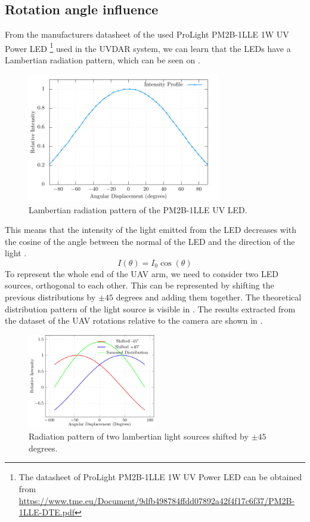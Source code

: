 \subsection{Rotation angle influence}
From the manufacturers datasheet of the used ProLight PM2B-1LLE 1W \ac{UV} Power \ac{LED} \footnote{The datasheet of ProLight PM2B-1LLE 1W UV Power LED can be obtained from \url{https://www.tme.eu/Document/9dfb498784ffdd07892a42f4f17c6f37/PM2B-1LLE-DTE.pdf}}
used in the UVDAR system, we can learn that the \ac{LED}s have a Lambertian radiation pattern,
which can be seen on .
\begin {figure}[H]
	\centering
	\includegraphics[width=0.75\textwidth]{./fig/semestral/lambertian/_new_lambertian.pdf}
	\caption{Lambertian radiation pattern of the PM2B-1LLE UV LED.}
	\label{fig:lambertian}
\end{figure}
This means that the intensity of the light emitted from the LED decreases with the cosine
of the angle between the normal of the LED and the direction of the light .
\begin{equation}
	I(\theta) = I_0\cos(\theta)
	\label{eq:lambertian}
\end{equation}
To represent the whole end of the \ac{UAV} arm, we need to consider two \ac{LED} sources, orthogonal to each other.
This can be represented by shifting the previous distributions by $\pm 45$ degrees and adding them together. The 
theoretical distribution pattern of the light source is visible in . 
The results extracted from the dataset of the \ac{UAV} rotations relative to the camera are shown in .
\begin {figure}[H]
	\centering
	\includegraphics[width=0.50\textwidth]{./fig/semestral/lambertian/3lambertian.pdf}
	\caption{Radiation pattern of two lambertian light sources shifted by $\pm 45$ degrees.}
	\label{fig:lambert_combined}
\end{figure}

